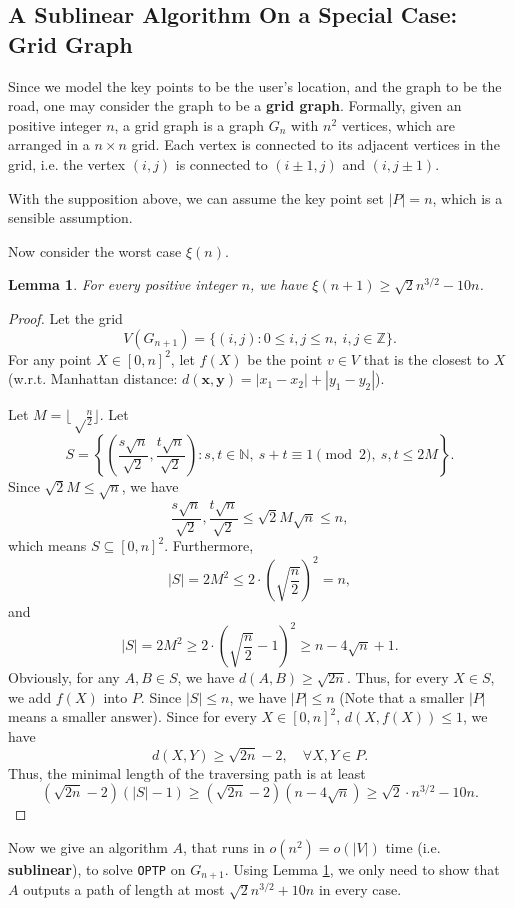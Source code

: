 \documentclass[11pt]{article}
\theoremstyle{plain}
\newtheorem{lemma}{Lemma}[section]
\begin{document}
\subsection{A Sublinear Algorithm On a Special Case: Grid Graph}

Since we model the key points to be the user's location, and the graph to be the road, one may consider the graph to be a \textbf{grid graph}. Formally, given an positive integer $n$, a grid graph is a graph $G_n$ with $n^2$ vertices, which are arranged in a $n\times n$ grid. Each vertex is connected to its adjacent vertices in the grid, i.e. the vertex $(i,j)$ is connected to $(i\pm 1,j)$ and $(i,j\pm 1)$.

With the supposition above, we can assume the key point set $|P|=n$, which is a sensible assumption.

Now consider the worst case $\xi(n)$. 

\begin{lemma}
\label{hahaha1}
For every positive integer $n$, we have $\xi(n+1)\ge \sqrt{2}n^{3/2}-10n$.
\end{lemma}
\begin{proof}
Let the grid
$$V(G_{n+1})=\{(i,j):0\le i,j\le n,\ i,j\in \mathbb{Z}\}.$$
For any point $X\in [0,n]^2$, let $f(X)$ be the point $v\in V$ that is the closest to $X$ (w.r.t. Manhattan distance: $d(\mathbf{x},\mathbf{y})=|x_1-x_2|+|y_1-y_2|$).

Let $M=\lfloor \sqrt\frac{n}{2}\rfloor$. Let
$$S=\left\{\left(\dfrac{s\sqrt{n}}{\sqrt{2}},\dfrac{t\sqrt{n}}{\sqrt{2}}\right):s,t\in \mathbb{N},\ s+t\equiv 1\pmod 2,\ s,t\le 2M\right\}.$$
Since $\sqrt{2}M\le \sqrt{n}$, we have
$$\dfrac{s\sqrt{n}}{\sqrt{2}},\dfrac{t\sqrt{n}}{\sqrt{2}}\le \sqrt{2}M\sqrt{n}\le n,$$
which means $S\subseteq [0,n]^2$. Furthermore,
$$|S|=2M^2\le 2\cdot \left(\sqrt{\dfrac{n}{2}}\right)^2=n,$$
and
$$|S|=2M^2\ge 2\cdot \left(\sqrt{\dfrac{n}{2}}-1\right)^2\ge n-4\sqrt{n}+1.$$
Obviously, for any $A,B\in S$, we have $d(A,B)\ge \sqrt{2n}$. Thus, for every $X\in S$, we add $f(X)$ into $P$. Since $|S|\le n$, we have $|P|\le n$ (Note that a smaller $|P|$ means a smaller answer). Since for every $X\in [0,n]^2$, $d(X,f(X))\le 1$, we have
$$d(X,Y)\ge \sqrt{2n}-2,\quad \forall X,Y\in P.$$
Thus, the minimal length of the traversing path is at least
$$(\sqrt{2n}-2)(|S|-1)\ge (\sqrt{2n}-2)(n-4\sqrt{n})\ge \sqrt{2}\cdot n^{3/2}-10n.$$
\end{proof}

Now we give an algorithm $A$, that runs in $o(n^2)=o(|V|)$ time (i.e. \textbf{sublinear}), to solve \texttt{OPTP} on $G_{n+1}$. Using Lemma \ref{hahaha1}, we only need to show that $A$ outputs a path of length at most $\sqrt{2}n^{3/2}+10n$ in every case.
\end{document}
